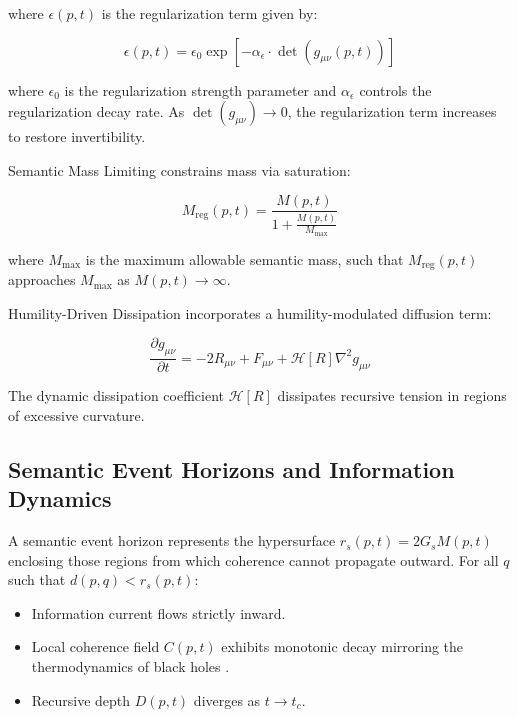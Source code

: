 where \(\epsilon(p, t)\) is the regularization term given by:

\begin{equation}
\epsilon(p, t) = \epsilon_0 \exp\left[-\alpha_{\epsilon} \cdot \det(g_{\mu\nu}(p, t))\right]
\end{equation}

where \(\epsilon_0\) is the regularization strength parameter and \(\alpha_{\epsilon}\) controls the regularization decay rate. As \(\det(g_{\mu\nu}) \to 0\), the regularization term increases to restore invertibility.

Semantic Mass Limiting constrains mass via saturation:

\begin{equation}
M_{\text{reg}}(p, t) = \frac{M(p, t)}{1 + \frac{M(p, t)}{M_{\text{max}}}}
\end{equation}

where \(M_{\text{max}}\) is the maximum allowable semantic mass, such that \(M_{\text{reg}}(p, t)\) approaches \(M_{\text{max}}\) as \(M(p, t) \to \infty\).

Humility-Driven Dissipation incorporates a humility-modulated diffusion term:

\begin{equation}
\frac{\partial g_{\mu\nu}}{\partial t} = -2R_{\mu\nu} + F_{\mu\nu} + \mathcal{H}[R] \nabla^2 g_{\mu\nu}
\end{equation}

The dynamic dissipation coefficient \(\mathcal{H}[R]\) dissipates recursive tension in regions of excessive curvature.


\subsection{Semantic Event Horizons and Information Dynamics}
\label{12.2.2:semantic_event_horizons_and_information_dynamics}

A semantic event horizon represents the hypersurface \(r_s(p, t) = 2G_s M(p, t)\) enclosing those regions from which coherence cannot propagate outward. For all \(q\) such that \(d(p, q) < r_s(p, t)\):

\begin{itemize}

    \item Information current flows strictly inward.

    \item Local coherence field \(C(p, t)\) exhibits monotonic decay mirroring the thermodynamics of black holes \autocite{Hawking1975}.

    \item Recursive depth \(D(p, t)\) diverges as \(t \to t_c\).

\end{itemize}


